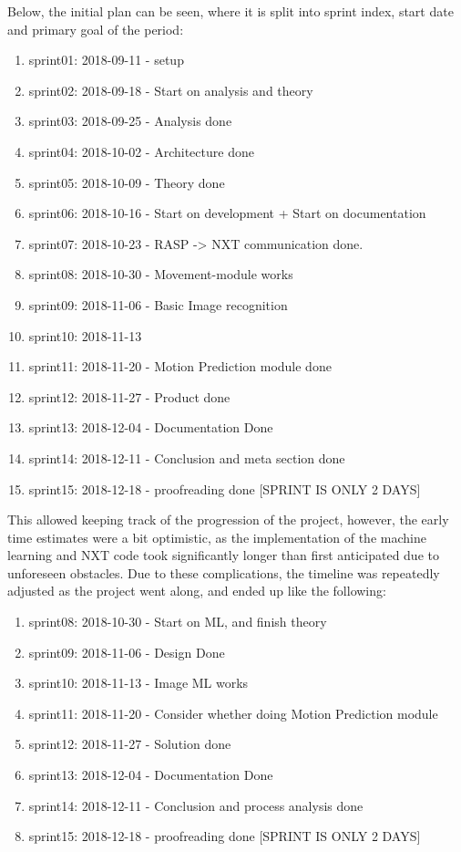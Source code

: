 Below, the initial plan can be seen, where it is split into sprint index, start date and primary goal of the period:
\begin{enumerate}
	\item sprint01: 2018-09-11 - setup
	\item sprint02: 2018-09-18 - Start on analysis and theory
	\item sprint03: 2018-09-25 - Analysis done
	\item sprint04: 2018-10-02 - Architecture done
	\item sprint05: 2018-10-09 - Theory done
	\item sprint06: 2018-10-16 - Start on development + Start on documentation
	\item sprint07: 2018-10-23 - RASP -> NXT communication done.
	\item sprint08: 2018-10-30 - Movement-module works
	\item sprint09: 2018-11-06 - Basic Image recognition
	\item sprint10: 2018-11-13
	\item sprint11: 2018-11-20 - Motion Prediction module done
	\item sprint12: 2018-11-27 - Product done
	\item sprint13: 2018-12-04 - Documentation Done
	\item sprint14: 2018-12-11 - Conclusion and meta section done
	\item sprint15: 2018-12-18 - proofreading done [SPRINT IS ONLY 2 DAYS]
\end{enumerate}

This allowed keeping track of the progression of the project, however, the early time estimates were a bit optimistic, as the implementation of the machine learning and NXT code took significantly longer than first anticipated due to unforeseen obstacles.
Due to these complications, the timeline was repeatedly adjusted as the project went along, and ended up like the following:
\begin{enumerate}
	\item	sprint08: 2018-10-30 - Start on ML, and finish theory
	\item	sprint09: 2018-11-06 - Design Done
	\item	sprint10: 2018-11-13 - Image ML works
	\item	sprint11: 2018-11-20 - Consider whether doing Motion Prediction module
	\item	sprint12: 2018-11-27 - Solution done
	\item	sprint13: 2018-12-04 - Documentation Done
	\item	sprint14: 2018-12-11 - Conclusion and process analysis done
	\item	sprint15: 2018-12-18 - proofreading done [SPRINT IS ONLY 2 DAYS]
\end{enumerate}

